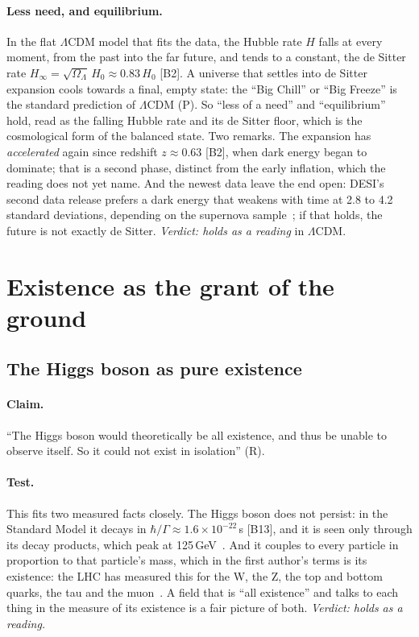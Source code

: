 \documentclass[11pt,a4paper]{article}
\theoremstyle{definition}
\newcommand{\chk}[1]{\textsf{[#1]}}
\newcommand{\tagR}{\textsf{(R)}}
\newcommand{\tagP}{\textsf{(P)}}
\begin{document}
\paragraph{Less need, and equilibrium.} In the flat $\Lambda$CDM model that fits the data, the Hubble rate $H$ falls at every moment, from
the past into the far future, and tends to a constant, the de Sitter rate $H_\infty=\sqrt{\Omega_\Lambda}\,H_0\approx0.83\,H_0$ \chk{B2}. A
universe that settles into de Sitter expansion cools towards a final, empty state: the ``Big Chill'' or ``Big Freeze'' is the standard
prediction of $\Lambda$CDM \tagP. So ``less of a need'' and ``equilibrium'' hold, read as the falling Hubble rate and its de Sitter floor,
which is the cosmological form of the balanced state. Two remarks. The expansion has \emph{accelerated} again since redshift $z\approx0.63$
\chk{B2}, when dark energy began to dominate; that is a second phase, distinct from the early inflation, which the reading does not yet
name. And the newest data leave the end open: DESI's second data release prefers a dark energy that weakens with time at 2.8 to 4.2
standard deviations, depending on the supernova sample~\cite{desi2}; if that holds, the future is not exactly de Sitter. \emph{Verdict:
holds as a reading} in $\Lambda$CDM.

\section{Existence as the grant of the ground}\label{sec:grant}

\subsection{The Higgs boson as pure existence}

\paragraph{Claim.} ``The Higgs boson would theoretically be all existence, and thus be unable to observe itself. So it could not exist in
isolation'' \tagR.

\paragraph{Test.} This fits two measured facts closely. The Higgs boson does not persist: in the Standard Model it decays in
$\hbar/\Gamma\approx1.6\times10^{-22}$\,s \chk{B13}, and it is seen only through its decay products, which peak at
125\,GeV~\cite{atlas12,cms12}. And it couples to every particle in proportion to that particle's mass, which in the first author's terms is
its existence: the LHC has measured this for the W, the Z, the top and bottom quarks, the tau and the muon~\cite{atlas22,cms22}. A field that
is ``all existence'' and talks to each thing in the measure of its existence is a fair picture of both. \emph{Verdict: holds as a reading.}
\end{document}
